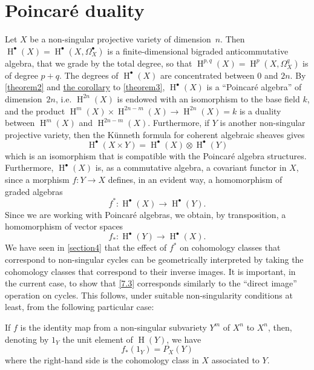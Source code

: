 \documentclass{article}
\theoremstyle{plain}
\newenvironment{theorem}[1]
  {\renewcommand\theinnercustomtheorem{#1}\innercustomtheorem}
  {\endinnercustomtheorem}
\theoremstyle{definition}
\DeclareMathOperator{\HH}{H}
\newcommand{\oldpage}[1]{\marginpar{\footnotesize$\Big\vert$ \textit{p.~#1}}}
\begin{document}
\section{Poincar\'{e} duality}
\label{section7}

Let $X$ be a non-singular projective variety of dimension~$n$.
Then $\HH^\bullet(X)=\HH^\bullet(X,\Omega_X^\bullet)$ is a finite-dimensional bigraded anticommutative algebra, that we grade by the total degree, so that $\HH^{p,q}(X)=\HH^p(X,\Omega_X^q)$ is of degree $p+q$.
The degrees of $\HH^\bullet(X)$ are concentrated between $0$ and $2n$.
By \cref{theorem2} and \hyperref[theorem3corollary]{the corollary} to \cref{theorem3}, $\HH^\bullet(X)$ is a ``Poincar\'{e} algebra'' of dimension~$2n$, i.e. $\HH^{2n}(X)$ is endowed with an isomorphism to the base field $k$, and the product $\HH^m(X)\times\HH^{2n-m}(X)\to\HH^{2n}(X)=k$ is a duality between $\HH^m(X)$ and $\HH^{2n-m}(X)$.
Furthermore, if $Y$ is another non-singular projective variety, then the K\"{u}nneth formula for coherent algebraic sheaves gives
\[
\label{7.1}
  \HH^\bullet(X\times Y) = \HH^\bullet(X)\otimes\HH^\bullet(Y)
\tag{7.1}
\]
which is an isomorphism that is compatible with the Poincar\'{e} algebra structures.
Furthermore, $\HH^\bullet(X)$ is, as a commutative algebra, a covariant functor in $X$, since a morphism $f\colon Y\to X$ defines, in an evident way, a homomorphism of graded algebras
\oldpage{149-20}
\[
\label{7.2}
  f^*\colon \HH^\bullet(X)\to\HH^\bullet(Y).
\tag{7.2}
\]
Since we are working with Poincar\'{e} algebras, we obtain, by transposition, a homomorphism of vector spaces
\[
\label{7.3}
  f_*\colon \HH^\bullet(Y)\to\HH^\bullet(X).
\tag{7.3}
\]
We have seen in \cref{section4} that the effect of $f^*$ on cohomology classes that correspond to non-singular cycles can be geometrically interpreted by taking the cohomology classes that correspond to their inverse images.
It is important, in the current case, to show that \cref{7.3} corresponds similarly to the ``direct image'' operation on cycles.
This follows, under suitable non-singularity conditions at least, from the following particular case:

\begin{theorem}{4}
\label{theorem4}
  If $f$ is the identity map from a non-singular subvariety $Y^m$ of $X^n$ to $X^n$, then, denoting by $1_Y$ the unit element of $\HH(Y)$, we have
  \[
  \label{7.4}
    f_*(1_Y) = P_X(Y)
  \tag{7.4}
  \]
  where the right-hand side is the cohomology class in $X$ associated to $Y$.
\end{theorem}
\end{document}
